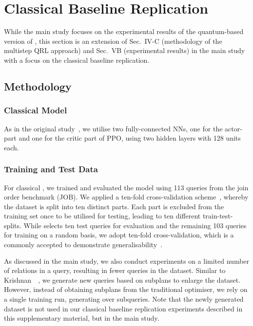 \documentclass[10pt, conference]{IEEEtran}
\begin{document}
\section{Classical Baseline Replication}
\label{sec:exp-crl}

While the main study focuses on the experimental results of the quantum-based version of \rj, this section is an extension of Sec.~IV-C (methodology of the multistep QRL approach) and Sec.~VB (experimental results) in the main study with a focus on the classical baseline replication.

\subsection{Methodology}

\subsubsection{Classical Model}
As in the original study~\cite{marcus18}, we utilise two fully-connected NNs, one for the actor-part and one for the critic part of PPO, using two hidden layers with 128 units each.

\subsubsection{Training and Test Data}
For classical \rj, we trained and evaluated the model using 113 queries from the join order benchmark (JOB).
We applied a ten-fold cross-validation scheme~\cite{fushiki2011}, whereby the dataset is split into ten distinct parts. Each part is excluded from the training set once to be utilised for testing, leading to ten different train-test-splits.
While \rj\cite{marcus18} selects ten test queries for evaluation and the remaining 103 queries for training on a random basis, we adopt ten-fold cross-validation, which is a commonly accepted to demonstrate generalisability~\cite{goodfellow16}.

As discussed in the main study, we also conduct experiments on a limited number of relations in a query, resulting in fewer queries in the dataset.
Similar to Krishnan~\etal~\cite{krishnan18}, we generate new queries based on subplans to enlarge the dataset.
However, instead of obtaining subplans from the traditional optimiser, we rely on a single \rj training run, generating over  subqueries.
Note that the newly generated dataset is not used in our classical baseline replication experiments described in this supplementary material, but in the main study.
\end{document}
